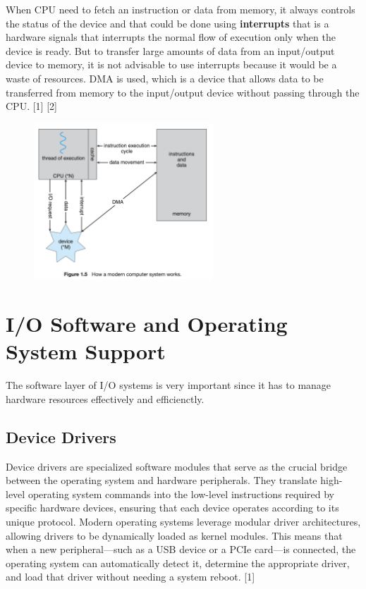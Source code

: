 \documentclass[a4paper]{article}
\begin{document}
When CPU need to fetch an instruction or data from memory, it always controls the status of the device and that could be done using \textbf{interrupts} that is a hardware signals 
that interrupts the normal flow of execution only when the device is ready. But to
 transfer large amounts of data from an input/output device to memory, it is
not advisable to use interrupts because it would be a waste of resources. DMA is used, which 
is a device that allows data to be transferred from memory to the input/output device without passing 
through the CPU. [1] [2]


\begin{figure}[H]
    \centering
    \includegraphics[width=0.6\textwidth]{DMA.png}
\end{figure}

\section{I/O Software and Operating System Support}

The software layer of I/O systems is very important since it has to manage hardware resources effectively and efficienctly.

\subsection{Device Drivers}

Device drivers are specialized software modules that serve as the crucial bridge between the operating system and hardware peripherals. They translate high-level operating system commands into the low-level instructions required by specific hardware devices, ensuring that each device operates according to its unique protocol. Modern operating systems leverage modular driver architectures, allowing drivers to be dynamically loaded as kernel modules. This means that when a new peripheral—such as a USB device or a PCIe card—is connected, the operating system can automatically detect it, determine the appropriate driver, and load that driver without needing a system reboot. [1]
\end{document}
